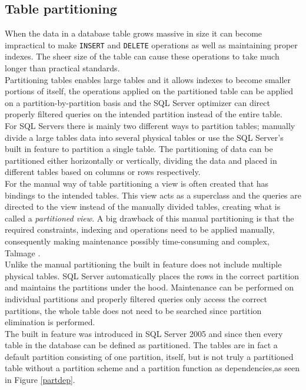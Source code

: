 \documentclass{cslthse-msc}
\begin{document}
\subsection{Table partitioning} \label{sec:tablepart}
When the data in a database table grows massive in size it can become impractical to make \texttt{INSERT} and \texttt{DELETE} operations as well as maintaining proper indexes. The sheer size of the table can cause these operations to take much longer than practical standards.\\
Partitioning tables enables large tables and it allows indexes to become smaller portions of itself, the operations applied on the partitioned table can be applied on a partition-by-partition basis and the SQL Server optimizer can direct properly filtered queries on the intended partition instead of the entire table.\\
For SQL Servers there is mainly two different ways to partition tables; manually divide a large tables data into several physical tables or use the SQL Server's built in feature to partition a single table. The partitioning of data can be partitioned either horizontally or vertically, dividing the data and placed in different tables based on columns or rows respectively.\\For the manual way of table partitioning a view is often created that has bindings to the intended tables. This view acts as a superclass and the queries are directed to the view instead of the manually divided tables, creating what is called a \textit{partitioned view}. A big drawback of this manual partitioning is that the required constraints, indexing and operations need to be applied manually, consequently making maintenance possibly time-consuming and complex, Talmage \cite{tablepartitioning}. \\
Unlike the manual partitioning the built in feature does not include multiple physical tables. SQL Server automatically places the rows in the correct partition and maintains the partitions under the hood. Maintenance can be performed on individual partitions and properly filtered queries only access the correct partitions, the whole table does not need to be searched since partition elimination is performed.\\
The built in feature was introduced in SQL Server 2005 and since then every table in the database can be defined as partitioned. The tables are in fact a default partition consisting of one partition, itself, but is not truly a partitioned table without a partition scheme and a partition function as dependencies,as seen in Figure \ref{partdep}.
 
\end{document}
